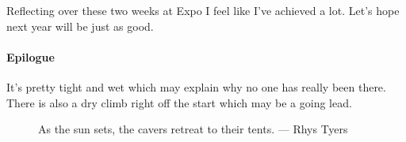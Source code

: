 Reflecting over these two weeks at Expo I feel like I’ve achieved a lot. Let’s hope next year will be just as good.

\paragraph{Epilogue}  It’s pretty tight and wet which may explain why no one has really been there. There is also a dry climb right off the start which may be a going lead. 

\begin{figure}[h!]
      \checkoddpage \ifoddpage \forcerectofloat \else \forceversofloat \fi
      \centering
       \label{tent at dusk}
  \caption{As the sun sets, the cavers retreat to their tents. --- Rhys Tyers}
\end{figure}
